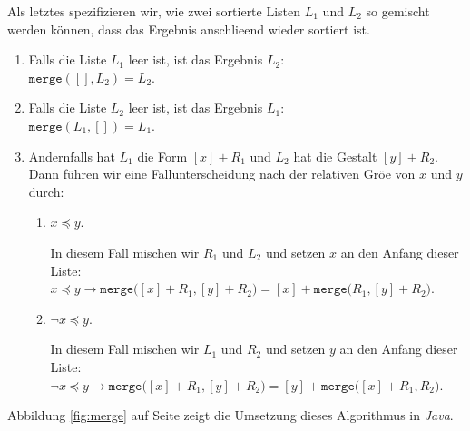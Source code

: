 Als letztes spezifizieren wir, wie zwei sortierte Listen $L_1$ 
und $L_2$ so gemischt werden k\"onnen, dass das Ergebnis anschlie\3end wieder sortiert ist.
\begin{enumerate}
\item Falls die Liste $L_1$ leer ist, ist das Ergebnis $L_2$: \\[0.1cm]
      \hspace*{1.3cm} 
      $\mathtt{merge}([], L_2) = L_2$.
\item Falls die Liste $L_2$ leer ist, ist das Ergebnis $L_1$: \\[0.1cm]
      \hspace*{1.3cm} 
      $\mathtt{merge}(L_1, []) = L_1$.
\item Andernfalls hat $L_1$ die Form $[x] + R_1$ und $L_2$ hat die Gestalt $[y] + R_2$.
      Dann f\"uhren wir eine Fallunterscheidung nach der relativen Gr\"o\3e von $x$ und $y$ durch:
      \begin{enumerate}
      \item $x \preceq y$.

            In diesem Fall mischen wir $R_1$ und $L_2$ und setzen $x$ an den Anfang dieser Liste:\\[0.1cm]
            \hspace*{1.3cm} 
            $x \preceq y \rightarrow \mathtt{merge}\bigl([x]+R_1, [y]+R_2\bigr) = [x] + \mathtt{merge}\bigl(R_1,[y]+R_2\bigr)$.
      \item $\neg x \preceq y$.

            In diesem Fall mischen wir $L_1$ und $R_2$ und setzen $y$ an den Anfang dieser Liste:\\[0.1cm]
            \hspace*{1.3cm} 
            $\neg x \preceq y \rightarrow \mathtt{merge}\bigl([x]+R_1, [y]+R_2\bigr) = [y] + \mathtt{merge}\bigl([x] + R_1,R_2\bigr)$.
      \end{enumerate}
\end{enumerate}
Abbildung \ref{fig:merge} auf Seite \pageref{fig:merge} 
zeigt die Umsetzung dieses Algorithmus in \textsl{Java}.

